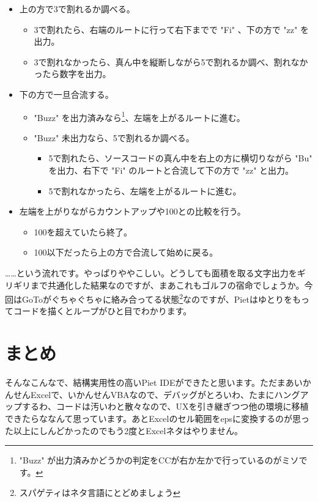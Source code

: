 \begin{itemize}
  \item 上の方で3で割れるか調べる。
  \begin{itemize}
    \item 3で割れたら、右端のルートに行って右下までで "Fi" 、下の方で "zz" を出力。
    \item 3で割れなかったら、真ん中を縦断しながら5で割れるか調べ、割れなかったら数字を出力。
  \end{itemize}
  \item 下の方で一旦合流する。
  \begin{itemize}
    \item "Buzz" を出力済みなら\footnote{"Buzz" が出力済みかどうかの判定をCCが右か左かで行っているのがミソです。}、左端を上がるルートに進む。
    \item "Buzz" 未出力なら、5で割れるか調べる。
    \begin{itemize}
      \item 5で割れたら、ソースコードの真ん中を右上の方に横切りながら "Bu" を出力、右下で "Fi" のルートと合流して下の方で "zz" と出力。
      \item 5で割れなかったら、左端を上がるルートに進む。
    \end{itemize}
  \end{itemize}
  \item 左端を上がりながらカウントアップや100との比較を行う。
  \begin{itemize}
    \item 100を超えていたら終了。
    \item 100以下だったら上の方で合流して始めに戻る。
  \end{itemize}
\end{itemize}

……という流れです。やっぱりややこしい。どうしても面積を取る文字出力をギリギリまで共通化した結果なのですが、まあこれもゴルフの宿命でしょうか。今回はGoToがぐちゃぐちゃに絡み合ってる状態\footnote{スパゲティはネタ言語にとどめましょう}なのですが、Pietはゆとりをもってコードを描くとループがひと目でわかります。

\section{まとめ}
そんなこんなで、結構実用性の高いPiet IDEができたと思います。ただまあいかんせんExcelで、いかんせんVBAなので、デバッグがとろいわ、たまにハングアップするわ、コードは汚いわと散々なので、UXを引き継ぎつつ他の環境に移植できたらななんて思っています。あとExcelのセル範囲をepsに変換するのが思った以上にしんどかったのでもう2度とExcelネタはやりません。